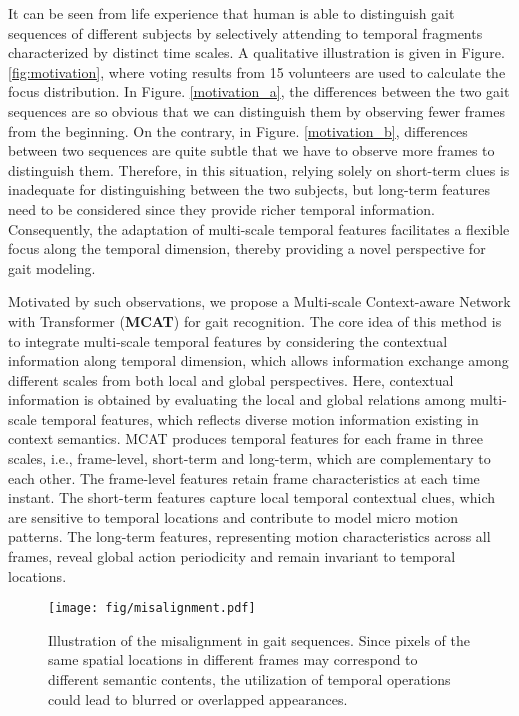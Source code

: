 \documentclass[journal]{IEEEtran}
\begin{document}
It can be seen from life experience that human is able to distinguish gait sequences of different subjects by selectively attending to temporal fragments characterized by distinct time scales. A qualitative illustration is given in Figure. \ref{fig:motivation}, where voting results from 15 volunteers are used to calculate the focus distribution. In Figure. \ref{motivation_a}, the differences between the two gait sequences are so obvious that we can distinguish them by observing fewer frames from the beginning. On the contrary, in Figure. \ref{motivation_b}, differences between two sequences are quite subtle that we have to observe more frames to distinguish them. Therefore, in this situation, relying solely on short-term clues is inadequate for distinguishing between the two subjects, but long-term features need to be considered since they provide richer temporal information. Consequently, the adaptation of multi-scale temporal features facilitates a flexible focus along the temporal dimension, thereby providing a novel perspective for gait modeling.
 
 Motivated by such observations, we propose a Multi-scale Context-aware Network with Transformer (\textbf{MCAT}) for gait recognition. The core idea of this method is to integrate multi-scale temporal features by considering the contextual information along temporal dimension, which allows information exchange among different scales from both local and global perspectives. Here, contextual information is obtained by evaluating the local and global relations among multi-scale temporal features, which reflects diverse motion information existing in context semantics. MCAT produces temporal features for each frame in three scales, i.e., frame-level, short-term and long-term, which are complementary to each other. The frame-level features retain frame characteristics at each time instant. The short-term features capture local temporal contextual clues, which are sensitive to temporal locations and contribute to model micro motion patterns. The long-term features, representing motion characteristics across all frames, reveal global action periodicity and remain invariant to temporal locations.
 
\begin{figure}[t]
    \centering
    \texttt{[image: fig/misalignment.pdf]}
    \caption{Illustration of the misalignment in gait sequences. Since pixels of the same spatial locations in different frames may correspond to different semantic contents, the utilization of temporal operations could lead to blurred or overlapped appearances.}
    \label{misalignment}
\end{figure}
 
\end{document}
